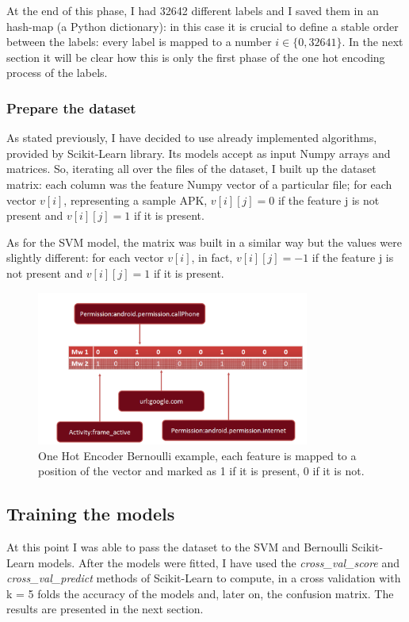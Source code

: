 \documentclass[12pt]{article}
\begin{document}
At the end of this phase, I had 32642 different labels and I saved them in an hash-map (a Python dictionary): in this case it is crucial to define a stable order between the labels: every label is mapped to a number $i \in \{0, 32641\}$.
In the next section it will be clear how this is only the first phase of the one hot encoding process of the labels.

\subsubsection{Prepare the dataset}
As stated previously, I have decided to use already implemented algorithms, provided by Scikit-Learn library. Its models accept as input Numpy arrays and matrices. So, iterating all over the files of the dataset, I built up the dataset matrix: each column was the feature Numpy vector of a particular file; for each vector $v[i]$, representing a sample APK, $v[i][j] = 0$ if the feature j is not present and $v[i][j] = 1$ if it is present.

As for the SVM model, the matrix was built in a similar way but the values were slightly different: for each vector $v[i]$, in fact, $v[i][j] = -1$ if the feature j is not present and $v[i][j] = 1$ if it is present.

\begin{figure}[!ht]
	\centering %
	\includegraphics[width=0.8\textwidth]{hotencode.png} %
	\caption{One Hot Encoder Bernoulli example, each feature is mapped to a position of the vector and marked as 1 if it is present, 0 if it is not.} 
	\label{fig:1_hot_encode}
\end{figure}

\subsection{Training the models}
At this point I was able to pass the dataset to the SVM and Bernoulli Scikit-Learn models. After the models were fitted, I have used the \textit{cross\_val\_score} and \textit{cross\_val\_predict} methods of Scikit-Learn to compute, in a cross validation with k = 5 folds the accuracy of the models and, later on, the confusion matrix. The results are presented in the next section.
\end{document}
